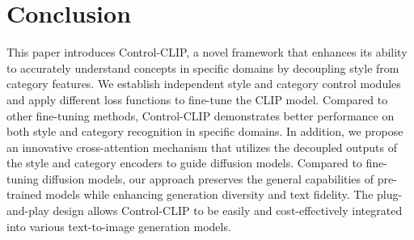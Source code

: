 \section{Conclusion}
This paper introduces Control-CLIP, a novel framework that enhances its ability to accurately understand concepts in specific domains by decoupling style from category features. We establish independent style and category control modules and apply different loss functions to fine-tune the CLIP model. Compared to other fine-tuning methods, Control-CLIP demonstrates better performance on both style and category recognition in specific domains. In addition, we propose an innovative cross-attention mechanism that utilizes the decoupled outputs of the style and category encoders to guide diffusion models. 
Compared to fine-tuning diffusion models, our approach preserves the general capabilities of pre-trained models while enhancing generation diversity and text fidelity. The plug-and-play design allows Control-CLIP to be easily and cost-effectively integrated into various text-to-image generation models.